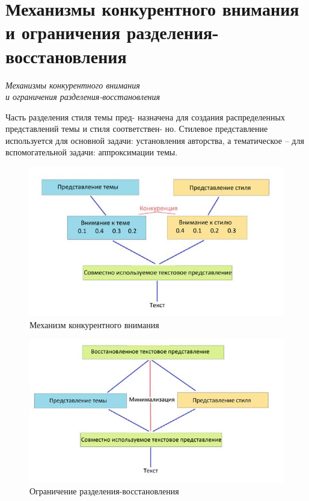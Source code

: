 \section{Механизмы конкурентного внимания\\{и ограничения разделения-восстановления}}
\begin{center}
\emph{Механизмы конкурентного внимания}\\
\emph{и ограничения разделения-восстановления}
\end{center}
\par Часть разделения стиля темы пред- назначена для создания распределенных 
представлений темы и стиля соответствен- но. Стилевое представление используется 
для основной задачи: установления авторства, а тематическое – для вспомогательной 
задачи: аппроксимации темы.

\begin{figure}[!ht]
    \begin{center}
    \includegraphics[scale=1.0]{images/pic1.jpg}
    \caption{Механизм конкурентного внимания}
    \label{fig:pic21}
    \end{center}
\end{figure}

\begin{figure}[!ht]
    \begin{center}
    \includegraphics[scale=1.0]{images/pic2.jpg}
    \caption{Ограничение разделения-восстановления}
    \label{fig:pic2}
    \end{center}
\end{figure}

